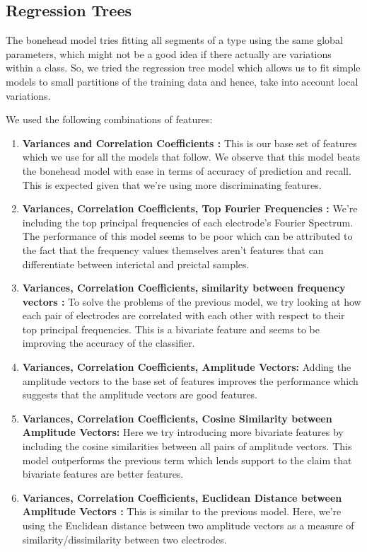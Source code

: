 \documentclass[a4paper]{article}
\begin{document}
\subsection{Regression Trees}
The bonehead model tries fitting all segments of a type using the same global parameters, which might not be a good idea if there actually are variations within a class. So, we tried the regression tree model which allows us to fit simple models to small partitions of the training data and hence, take into account local variations. 

We used the following combinations of features: 
\begin{enumerate}
\item \textbf{Variances and Correlation Coefficients :} This is our base set of features which we use for all the models that follow. We observe that this model beats the bonehead model with ease in terms of accuracy of prediction and recall. This is expected given that we're using more discriminating features.

\item \textbf{Variances, Correlation Coefficients, Top Fourier Frequencies :} We're including the top principal frequencies of each electrode's Fourier Spectrum. The performance of this model seems to be poor which can be attributed to the fact that the frequency values themselves aren't features that can differentiate between interictal and preictal samples.

\item \textbf{Variances, Correlation Coefficients, similarity between frequency vectors :} To solve the problems of the previous model, we try looking at how each pair of electrodes are correlated with each other with respect to their top principal frequencies. This is a bivariate feature and seems to be improving the accuracy of the classifier.

\item \textbf{Variances, Correlation Coefficients, Amplitude Vectors: } Adding the amplitude vectors to the base set of features improves the performance which suggests that the amplitude vectors are good features.

\item \textbf{Variances, Correlation Coefficients, Cosine Similarity between Amplitude Vectors: } Here we try introducing more bivariate features by including the cosine similarities between all pairs of amplitude vectors. This model outperforms the previous term which lends support to the claim that bivariate features are better features.

\item \textbf{Variances, Correlation Coefficients, Euclidean Distance between Amplitude Vectors :} This is similar to the previous model. Here, we're using the Euclidean distance between two amplitude vectors as a measure of similarity/dissimilarity between two electrodes.
\end{enumerate}
\end{document}
